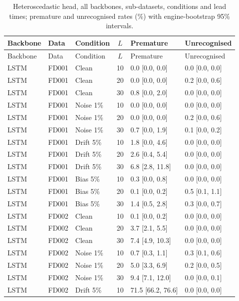 \documentclass[10pt,a4paper]{article}
\begin{document}
\begin{center}\scriptsize
\begin{longtable}{lllcll}
\caption{Heteroscedastic head, all backbones, sub-datasets, conditions and lead times; premature and unrecognised rates (\%) with engine-bootstrap 95\% intervals.}\\
\toprule
Backbone & Data & Condition & $L$ & Premature & Unrecognised \\ \midrule \endfirsthead
\toprule Backbone & Data & Condition & $L$ & Premature & Unrecognised \\ \midrule \endhead
LSTM & FD001 & Clean & 10 & 0.0 [0.0, 0.0] & 0.0 [0.0, 0.0]  \\
LSTM & FD001 & Clean & 20 & 0.0 [0.0, 0.0] & 0.2 [0.0, 0.6]  \\
LSTM & FD001 & Clean & 30 & 0.8 [0.0, 2.0] & 0.0 [0.0, 0.0]  \\
LSTM & FD001 & Noise 1\% & 10 & 0.0 [0.0, 0.0] & 0.0 [0.0, 0.0]  \\
LSTM & FD001 & Noise 1\% & 20 & 0.0 [0.0, 0.0] & 0.2 [0.0, 0.6]  \\
LSTM & FD001 & Noise 1\% & 30 & 0.7 [0.0, 1.9] & 0.1 [0.0, 0.2]  \\
LSTM & FD001 & Drift 5\% & 10 & 1.8 [0.0, 4.6] & 0.0 [0.0, 0.0]  \\
LSTM & FD001 & Drift 5\% & 20 & 2.6 [0.4, 5.4] & 0.0 [0.0, 0.0]  \\
LSTM & FD001 & Drift 5\% & 30 & 6.8 [2.8, 11.8] & 0.0 [0.0, 0.0]  \\
LSTM & FD001 & Bias 5\% & 10 & 0.3 [0.0, 0.8] & 0.0 [0.0, 0.0]  \\
LSTM & FD001 & Bias 5\% & 20 & 0.1 [0.0, 0.2] & 0.5 [0.1, 1.1]  \\
LSTM & FD001 & Bias 5\% & 30 & 1.4 [0.5, 2.8] & 0.3 [0.0, 0.7]  \\
LSTM & FD002 & Clean & 10 & 0.1 [0.0, 0.2] & 0.0 [0.0, 0.0]  \\
LSTM & FD002 & Clean & 20 & 3.7 [2.1, 5.5] & 0.0 [0.0, 0.0]  \\
LSTM & FD002 & Clean & 30 & 7.4 [4.9, 10.3] & 0.0 [0.0, 0.0]  \\
LSTM & FD002 & Noise 1\% & 10 & 0.7 [0.3, 1.1] & 0.3 [0.1, 0.6]  \\
LSTM & FD002 & Noise 1\% & 20 & 5.0 [3.3, 6.9] & 0.2 [0.0, 0.5]  \\
LSTM & FD002 & Noise 1\% & 30 & 9.4 [7.1, 12.0] & 0.0 [0.0, 0.1]  \\
LSTM & FD002 & Drift 5\% & 10 & 71.5 [66.2, 76.6] & 0.0 [0.0, 0.0]  \\

\end{longtable}
\end{center}
\end{document}
